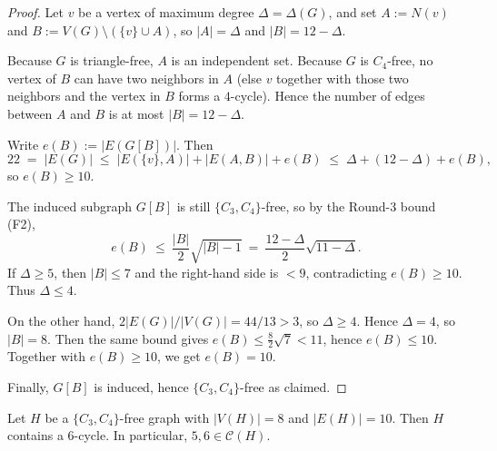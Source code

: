 \begin{proof}
Let $v$ be a vertex of maximum degree $\Delta=\Delta(G)$, and set $A:=N(v)$ and $B:=V(G)\setminus(\{v\}\cup A)$, so $|A|=\Delta$ and $|B|=12-\Delta$.

Because $G$ is triangle-free, $A$ is an independent set. Because $G$ is $C_4$-free, no vertex of $B$ can have two neighbors in $A$ (else $v$ together with those two neighbors and the vertex in $B$ forms a $4$-cycle).
Hence the number of edges between $A$ and $B$ is at most $|B|=12-\Delta$.

Write $e(B):=|E(G[B])|$.
Then
\[
22 \;=\; |E(G)| \;\le\; |E(\{v\},A)| + |E(A,B)| + e(B)
\;\le\; \Delta + (12-\Delta) + e(B),
\]
so $e(B)\ge 10$.

The induced subgraph $G[B]$ is still $\{C_3,C_4\}$-free, so by the Round-3 bound (F2),
\[
e(B)\ \le\ \frac{|B|}{2}\sqrt{|B|-1}\ =\ \frac{12-\Delta}{2}\sqrt{11-\Delta}.
\]
If $\Delta\ge 5$, then $|B|\le 7$ and the right-hand side is $<9$, contradicting $e(B)\ge 10$.
Thus $\Delta\le 4$.

On the other hand, $2|E(G)|/|V(G)|=44/13>3$, so $\Delta\ge 4$.
Hence $\Delta=4$, so $|B|=8$.
Then the same bound gives $e(B)\le \frac82\sqrt7<11$, hence $e(B)\le 10$.
Together with $e(B)\ge 10$, we get $e(B)=10$.

Finally, $G[B]$ is induced, hence $\{C_3,C_4\}$-free as claimed.
\end{proof}

\begin{lemma}\label{lem:8-10-has-C6}
Let $H$ be a $\{C_3,C_4\}$-free graph with $|V(H)|=8$ and $|E(H)|=10$.
Then $H$ contains a $6$-cycle.
In particular, $5,6\in\mathcal C(H)$.
\end{lemma}


